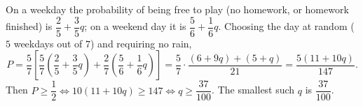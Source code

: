 On a weekday the probability of being free to play (no homework, or homework finished) is $\dfrac25+\dfrac35q$; on a weekend day it is $\dfrac56+\dfrac16q$. Choosing the day at random ($5$ weekdays out of $7$) and requiring no rain,
\[P=\dfrac57\left[\dfrac57\left(\dfrac25+\dfrac35q\right)+\dfrac27\left(\dfrac56+\dfrac16q\right)\right]=\dfrac57\cdot\dfrac{(6+9q)+(5+q)}{21}=\dfrac{5(11+10q)}{147}.\]
Then $P\ge\dfrac12\iff10(11+10q)\ge147\iff q\ge\dfrac{37}{100}$. The smallest such $q$ is $\boxed{\dfrac{37}{100}}$.
